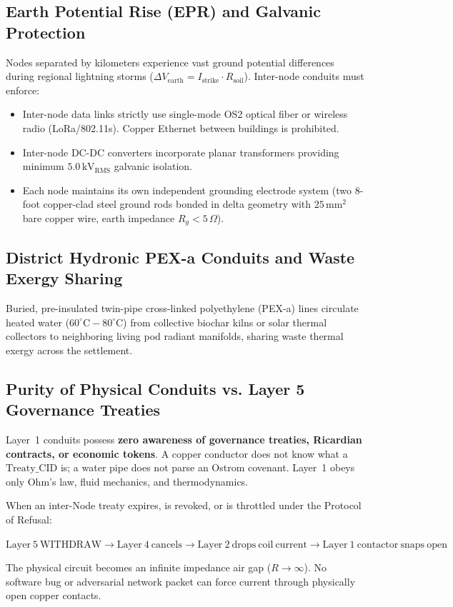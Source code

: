 \subsection{Earth Potential Rise (EPR) and Galvanic Protection}

Nodes separated by kilometers experience vast ground potential differences during regional lightning storms ($\Delta V_{\mathrm{earth}} = I_{\mathrm{strike}} \cdot R_{\mathrm{soil}}$). Inter-node conduits must enforce:
\begin{itemize}
    \item Inter-node data links strictly use single-mode OS2 optical fiber or wireless radio (LoRa/802.11s). Copper Ethernet between buildings is prohibited.
    \item Inter-node DC-DC converters incorporate planar transformers providing minimum $5.0\,\mathrm{kV}_{\mathrm{RMS}}$ galvanic isolation.
    \item Each node maintains its own independent grounding electrode system (two 8-foot copper-clad steel ground rods bonded in delta geometry with $25\,\mathrm{mm^2}$ bare copper wire, earth impedance $R_g < 5\,\Omega$).
\end{itemize}

\subsection{District Hydronic PEX-a Conduits and Waste Exergy Sharing}

Buried, pre-insulated twin-pipe cross-linked polyethylene (PEX-a) lines circulate heated water ($60^\circ\mathrm{C}-80^\circ\mathrm{C}$) from collective biochar kilns or solar thermal collectors to neighboring living pod radiant manifolds, sharing waste thermal exergy across the settlement.

\subsection{Purity of Physical Conduits vs. Layer 5 Governance Treaties}

Layer~1 conduits possess \textbf{zero awareness of governance treaties, Ricardian contracts, or economic tokens}. A copper conductor does not know what a $\mathrm{Treaty\_CID}$ is; a water pipe does not parse an Ostrom covenant. Layer~1 obeys only Ohm's law, fluid mechanics, and thermodynamics.

When an inter-Node treaty expires, is revoked, or is throttled under the Protocol of Refusal:
\begin{center}
$\mathrm{Layer~5~WITHDRAW} \longrightarrow \mathrm{Layer~4~cancels} \longrightarrow \mathrm{Layer~2~drops~coil~current} \longrightarrow \mathrm{Layer~1~contactor~snaps~open}$
\end{center}
The physical circuit becomes an infinite impedance air gap ($R \to \infty$). No software bug or adversarial network packet can force current through physically open copper contacts.

